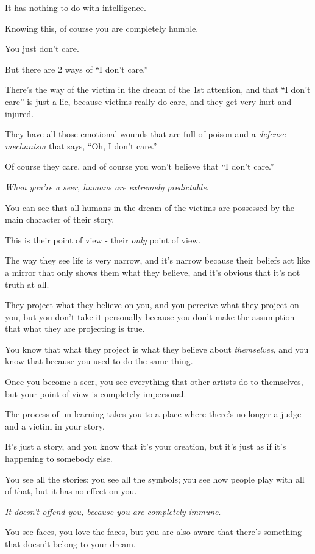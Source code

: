 \documentclass{article}
\numberwithin{equation}{section}
\begin{document}
It has nothing to do with intelligence.

Knowing this, of course you are completely humble.

You just don't care.

But there are 2 ways of ``I don't care.''

There's the way of the victim in the dream of the 1st attention, and that ``I don't care'' is just a lie, because victims really do care, and they get very hurt and injured.

They have all those emotional wounds that are full of poison and a \textit{defense mechanism} that says, ``Oh, I don't care.''

Of course they care, and of course you won't believe that ``I don't care.''

%
\textit{When you're a seer, humans are extremely predictable}.

You can see that all humans in the dream of the victims are possessed by the main character of their story.

This is their point of view - their \textit{only} point of view.

The way they see life is very narrow, and it's narrow because their beliefs act like a mirror that only shows them what they believe, and it's obvious that it's not truth at all.

They project what they believe on you, and you perceive what they project on you, but you don't take it personally because you don't make the assumption that what they are projecting is true.

You know that what they project is what they believe about \textit{themselves}, and you know that because you used to do the same thing.

%
Once you become a seer, you see everything that other artists do to themselves, but your point of view is completely impersonal.

The process of un-learning takes you to a place where there's no longer a judge and a victim in your story.

It's just a story, and you know that it's your creation, but it's just as if it's happening to somebody else.

You see all the stories; you see all the symbols; you see how people play with all of that, but it has no effect on you.

\textit{It doesn't offend you, because you are completely immune}.

You see faces, you love the faces, but you are also aware that there's something that doesn't belong to your dream.
\end{document}
